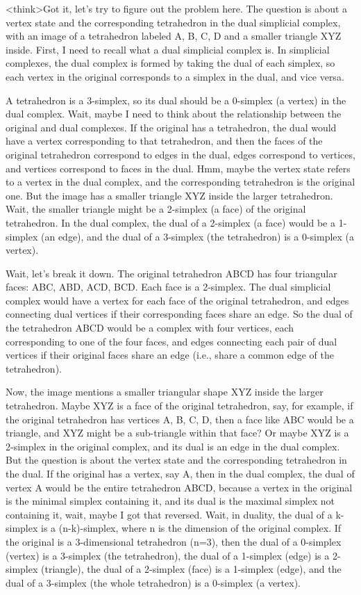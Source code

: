 <think>Got it, let's try to figure out the problem here. The question is about a vertex state and the corresponding tetrahedron in the dual simplicial complex, with an image of a tetrahedron labeled A, B, C, D and a smaller triangle XYZ inside. First, I need to recall what a dual simplicial complex is. In simplicial complexes, the dual complex is formed by taking the dual of each simplex, so each vertex in the original corresponds to a simplex in the dual, and vice versa. 

A tetrahedron is a 3-simplex, so its dual should be a 0-simplex (a vertex) in the dual complex. Wait, maybe I need to think about the relationship between the original and dual complexes. If the original has a tetrahedron, the dual would have a vertex corresponding to that tetrahedron, and then the faces of the original tetrahedron correspond to edges in the dual, edges correspond to vertices, and vertices correspond to faces in the dual. Hmm, maybe the vertex state refers to a vertex in the dual complex, and the corresponding tetrahedron is the original one. But the image has a smaller triangle XYZ inside the larger tetrahedron. Wait, the smaller triangle might be a 2-simplex (a face) of the original tetrahedron. In the dual complex, the dual of a 2-simplex (a face) would be a 1-simplex (an edge), and the dual of a 3-simplex (the tetrahedron) is a 0-simplex (a vertex). 

Wait, let's break it down. The original tetrahedron ABCD has four triangular faces: ABC, ABD, ACD, BCD. Each face is a 2-simplex. The dual simplicial complex would have a vertex for each face of the original tetrahedron, and edges connecting dual vertices if their corresponding faces share an edge. So the dual of the tetrahedron ABCD would be a complex with four vertices, each corresponding to one of the four faces, and edges connecting each pair of dual vertices if their original faces share an edge (i.e., share a common edge of the tetrahedron). 

Now, the image mentions a smaller triangular shape XYZ inside the larger tetrahedron. Maybe XYZ is a face of the original tetrahedron, say, for example, if the original tetrahedron has vertices A, B, C, D, then a face like ABC would be a triangle, and XYZ might be a sub-triangle within that face? Or maybe XYZ is a 2-simplex in the original complex, and its dual is an edge in the dual complex. But the question is about the vertex state and the corresponding tetrahedron in the dual. If the original has a vertex, say A, then in the dual complex, the dual of vertex A would be the entire tetrahedron ABCD, because a vertex in the original is the minimal simplex containing it, and its dual is the maximal simplex not containing it, wait, maybe I got that reversed. Wait, in duality, the dual of a k-simplex is a (n-k)-simplex, where n is the dimension of the original complex. If the original is a 3-dimensional tetrahedron (n=3), then the dual of a 0-simplex (vertex) is a 3-simplex (the tetrahedron), the dual of a 1-simplex (edge) is a 2-simplex (triangle), the dual of a 2-simplex (face) is a 1-simplex (edge), and the dual of a 3-simplex (the whole tetrahedron) is a 0-simplex (a vertex). 

